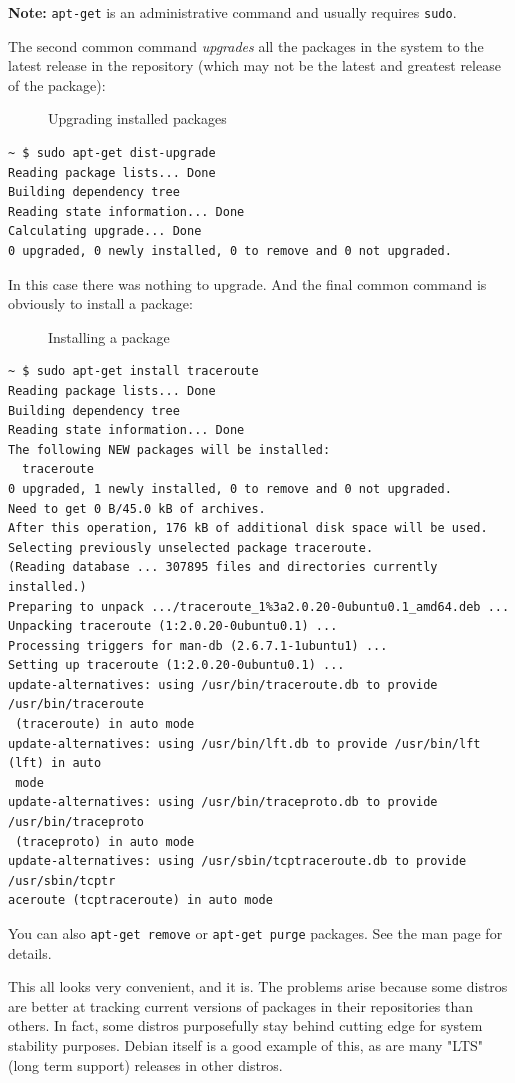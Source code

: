 \documentclass[10pt,]{book}
\numberwithin{figure}{chapter}
\DeclareRobustCommand{\drcap}[1]{\begin{figure}[H]\caption{#1}\end{figure}}
\begin{document}
\textbf{Note:} \texttt{apt-get} is an administrative command and usually
requires \texttt{sudo}.

The second common command \emph{upgrades} all the packages in the system
to the latest release in the repository (which may not be the latest and
greatest release of the package):

\drcap{Upgrading installed packages}

\begin{verbatim}
~ $ sudo apt-get dist-upgrade
Reading package lists... Done
Building dependency tree       
Reading state information... Done
Calculating upgrade... Done
0 upgraded, 0 newly installed, 0 to remove and 0 not upgraded.
\end{verbatim}

In this case there was nothing to upgrade. And the final common command
is obviously to install a package:

\drcap{Installing a package}

\begin{verbatim}
~ $ sudo apt-get install traceroute
Reading package lists... Done
Building dependency tree       
Reading state information... Done
The following NEW packages will be installed:
  traceroute
0 upgraded, 1 newly installed, 0 to remove and 0 not upgraded.
Need to get 0 B/45.0 kB of archives.
After this operation, 176 kB of additional disk space will be used.
Selecting previously unselected package traceroute.
(Reading database ... 307895 files and directories currently installed.)
Preparing to unpack .../traceroute_1%3a2.0.20-0ubuntu0.1_amd64.deb ...
Unpacking traceroute (1:2.0.20-0ubuntu0.1) ...
Processing triggers for man-db (2.6.7.1-1ubuntu1) ...
Setting up traceroute (1:2.0.20-0ubuntu0.1) ...
update-alternatives: using /usr/bin/traceroute.db to provide /usr/bin/traceroute
 (traceroute) in auto mode
update-alternatives: using /usr/bin/lft.db to provide /usr/bin/lft (lft) in auto
 mode
update-alternatives: using /usr/bin/traceproto.db to provide /usr/bin/traceproto
 (traceproto) in auto mode
update-alternatives: using /usr/sbin/tcptraceroute.db to provide /usr/sbin/tcptr
aceroute (tcptraceroute) in auto mode
\end{verbatim}

You can also \texttt{apt-get remove} or \texttt{apt-get purge} packages.
See the man page for details.

This all looks very convenient, and it is. The problems arise because
some distros are better at tracking current versions of packages in
their repositories than others. In fact, some distros purposefully stay
behind cutting edge for system stability purposes. Debian itself is a
good example of this, as are many "LTS" (long term support) releases in
other distros.
\end{document}
